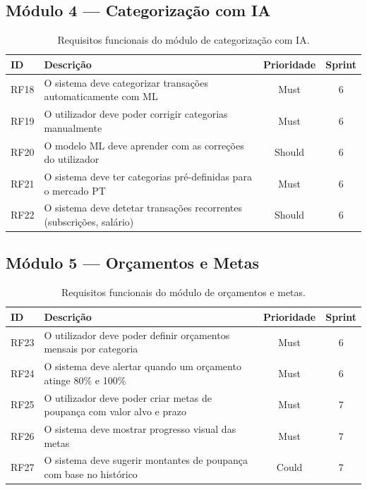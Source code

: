 \subsection{Módulo 4 --- Categorização com IA}

\begin{table}[H]
\centering
\caption{Requisitos funcionais do módulo de categorização com IA.}
\label{tab:rf-ia}
\small
\begin{tabularx}{\textwidth}{l X c c}
\toprule
\textbf{ID} & \textbf{Descrição} & \textbf{Prioridade} & \textbf{Sprint} \\
\midrule
RF18 & O sistema deve categorizar transações automaticamente com \ac{ML} & Must & 6 \\
RF19 & O utilizador deve poder corrigir categorias manualmente & Must & 6 \\
RF20 & O modelo \ac{ML} deve aprender com as correções do utilizador & Should & 6 \\
RF21 & O sistema deve ter categorias pré-definidas para o mercado PT & Must & 6 \\
RF22 & O sistema deve detetar transações recorrentes (subscrições, salário) & Should & 6 \\
\bottomrule
\end{tabularx}
\end{table}

\subsection{Módulo 5 --- Orçamentos e Metas}

\begin{table}[H]
\centering
\caption{Requisitos funcionais do módulo de orçamentos e metas.}
\label{tab:rf-budgets}
\small
\begin{tabularx}{\textwidth}{l X c c}
\toprule
\textbf{ID} & \textbf{Descrição} & \textbf{Prioridade} & \textbf{Sprint} \\
\midrule
RF23 & O utilizador deve poder definir orçamentos mensais por categoria & Must & 6 \\
RF24 & O sistema deve alertar quando um orçamento atinge 80\% e 100\% & Must & 6 \\
RF25 & O utilizador deve poder criar metas de poupança com valor alvo e prazo & Must & 7 \\
RF26 & O sistema deve mostrar progresso visual das metas & Must & 7 \\
RF27 & O sistema deve sugerir montantes de poupança com base no histórico & Could & 7 \\
\bottomrule
\end{tabularx}
\end{table}

